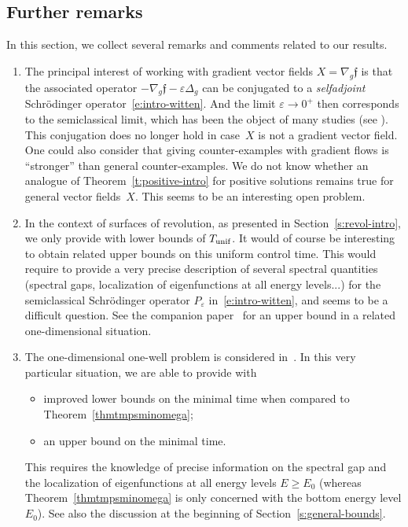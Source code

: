 \documentclass[JEP,XML,SOM,Unicode]{cedram}
\newcommand{\unif}{\textup{unif}}
\theoremstyle{definition}
\newcommand{\f}{\ensuremath{\mathfrak{f}}}
\newcommand\nablag{\nabla_{g}}
\let\eps\varepsilon
\begin{document}
\subsection{Further remarks}
In this section, we collect several remarks and comments related to our results.
\begin{enumerate}
\item The principal interest of working with gradient vector fields $X=\nablag\f$ is that the associated operator $-\nablag\f-\eps\Delta_g$ can be conjugated to a {\em selfadjoint} Schrödinger operator~\eqref{e:intro-witten}.
And the limit $\eps\to 0^+$ then corresponds to the semiclassical limit, which has been the object of many studies (see \eg \cite{Witten:82,Simon:83,HS84,HS:85,Helffer:booksemiclassic,CFKS,Allibert:98,HKN:04,HN:06}).
This conjugation does no longer hold in case~$X$ is not a gradient vector field.
One could also consider that giving counter-examples with gradient flows is ``stronger'' than general counter-examples.
We do not know whether an analogue of Theorem~\ref{t:positive-intro} for positive solutions remains true for general vector fields~$X$. This seems to be an interesting open problem.

\item In the context of surfaces of revolution, as presented in Section~\ref{s:revol-intro}, we only provide with lower bounds of $T_{\unif}$. It would of course be interesting to obtain related upper bounds on this uniform control time. This would require to provide a very precise description of several spectral quantities (spectral gaps, localization of eigenfunctions at all energy levels...) for the semiclassical Schrödinger operator $P_\eps$ in~\eqref{e:intro-witten}, and seems to be a difficult question.
See the companion paper~\cite{LL:20-1D} for an upper bound in a related one-dimensional situation.

\item The one-dimensional one-well problem is considered in~\cite{LL:20-1D}. In this very particular situation, we are able to provide with
\begin{itemize}
\item improved lower bounds on the minimal time when compared to Theorem~\ref{thmtmpsminomega};
\item an upper bound on the minimal time.
\end{itemize}
This requires the knowledge of precise information on the spectral gap and the localization of eigenfunctions at all energy levels $E\geq E_0$ (whereas Theorem~\ref{thmtmpsminomega} is only concerned with the bottom energy level $E_0$). See also the discussion at the beginning of Section~\ref{s:general-bounds}.


\end{enumerate}
\end{document}
